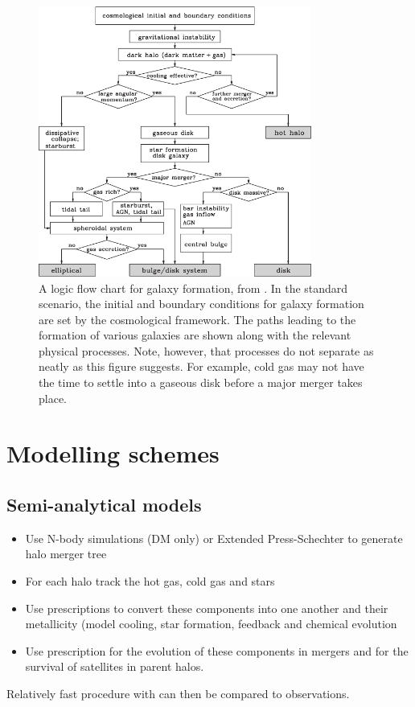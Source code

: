 \begin{figure}
	\includegraphics[width=0.8\textwidth]{img/ch-05/galaxy-decision.pdf}
	\caption{A logic flow chart for galaxy formation, from \cite{galaxy-formation}. In the standard scenario, the initial and boundary conditions for galaxy formation are set by the cosmological framework. The paths leading to the formation of various galaxies are shown along with the relevant physical processes. Note, however, that processes do not separate as neatly as this figure suggests. For example, cold gas may not have the time to settle into a gaseous disk before a major merger takes place.}
	\label{fig:galaxy-decision}
\end{figure}


\section{Modelling schemes}

\subsection{Semi-analytical models}
\begin{itemize}
	\item Use N-body simulations (DM only) or Extended Press-Schechter to generate halo merger tree
	\item For each halo track the hot gas, cold gas and stars
	\item Use prescriptions to convert these components into one another and their metallicity (model cooling, star formation, feedback and chemical evolution
	\item Use prescription for the evolution of these components in mergers and for the survival of satellites in parent halos.
\end{itemize}
Relatively fast procedure with can then be compared to observations.

